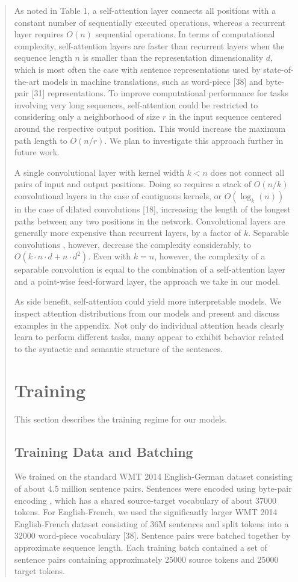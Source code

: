 \documentclass[12pt, a4paper]{article}
\begin{document}
\begin{abstract}
As noted in Table 1, a self-attention layer connects all positions with a constant number of sequentially executed operations, whereas a recurrent layer requires $O(n)$ sequential operations. In terms of computational complexity, self-attention layers are faster than recurrent layers when the sequence length $n$ is smaller than the representation dimensionality $d$, which is most often the case with sentence representations used by state-of-the-art models in machine translations, such as word-piece [38] and byte-pair [31] representations. To improve computational performance for tasks involving very long sequences, self-attention could be restricted to considering only a neighborhood of size $r$ in the input sequence centered around the respective output position. This would increase the maximum path length to $O(n/r)$. We plan to investigate this approach further in future work.

A single convolutional layer with kernel width $k < n$ does not connect all pairs of input and output positions. Doing so requires a stack of $O(n/k)$ convolutional layers in the case of contiguous kernels, or $O(\log_k(n))$ in the case of dilated convolutions [18], increasing the length of the longest paths between any two positions in the network. Convolutional layers are generally more expensive than recurrent layers, by a factor of $k$. Separable convolutions \cite{ref6}, however, decrease the complexity considerably, to $O(k \cdot n \cdot d + n \cdot d^2)$. Even with $k = n$, however, the complexity of a separable convolution is equal to the combination of a self-attention layer and a point-wise feed-forward layer, the approach we take in our model.

As side benefit, self-attention could yield more interpretable models. We inspect attention distributions from our models and present and discuss examples in the appendix. Not only do individual attention heads clearly learn to perform different tasks, many appear to exhibit behavior related to the syntactic and semantic structure of the sentences.

\section{Training}
This section describes the training regime for our models.

\subsection{Training Data and Batching}
We trained on the standard WMT 2014 English-German dataset consisting of about 4.5 million sentence pairs. Sentences were encoded using byte-pair encoding \cite{ref3}, which has a shared source-target vocabulary of about 37000 tokens. For English-French, we used the significantly larger WMT 2014 English-French dataset consisting of 36M sentences and split tokens into a 32000 word-piece vocabulary [38]. Sentence pairs were batched together by approximate sequence length. Each training batch contained a set of sentence pairs containing approximately 25000 source tokens and 25000 target tokens.


\end{abstract}
\end{document}
